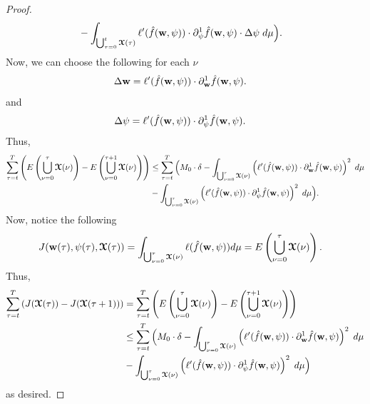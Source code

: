 \begin{proof}
\begin{align*}
        & -\displaystyle\int_{\bigcup_{\tau = 0}^{t}\boldsymbol{\mathcal{X}}(\tau)} \ell'(\hat{f}(\boldsymbol{\mathrm{w}},\psi))\cdot \partial_{\psi}^1 \hat{f}(\boldsymbol{\mathrm{w}},\psi)\cdot \Delta \psi \hspace{1mm}  d\mu\Big).
    \end{align*}
    Now, we can choose the following for each $\nu$
    \begin{align*}
        \Delta \boldsymbol{\mathrm{w}} & =  \ell'(\hat{f}(\boldsymbol{\mathrm{w}},\psi))\cdot \partial_{\boldsymbol{\mathrm{w}}}^1 \hat{f}(\boldsymbol{\mathrm{w}},\psi).
    \end{align*}
    and
    \begin{align*}
        \Delta \psi & =  \ell'(\hat{f}(\boldsymbol{\mathrm{w}},\psi))\cdot \partial_{\psi}^1 \hat{f}(\boldsymbol{\mathrm{w}},\psi).
    \end{align*}
    Thus,
    \begin{align*}
         \sum_{\tau = t}^{T} \left(E\left(\bigcup_{\nu = 0}^{\tau}\boldsymbol{\mathcal{X}}(\nu)\right) - E\left(\bigcup_{\nu = 0}^{\tau+1}\boldsymbol{\mathcal{X}}(\nu)\right)\right)
        & \leq \sum_{\tau =t}^{T} \Big( M_0\cdot \delta - \displaystyle\int_{\bigcup_{\nu = 0}^\tau\boldsymbol{\mathcal{X}}(\nu)} \left(\ell'(\hat{f}(\boldsymbol{\mathrm{w}},\psi))\cdot \partial_{\boldsymbol{\mathrm{w}}}^1 \hat{f}(\boldsymbol{\mathrm{w}},\psi)\right)^2 \hspace{1mm}  d\mu\\
        & -\displaystyle\int_{\bigcup_{\nu = 0}^\tau\boldsymbol{\mathcal{X}}(\nu)} \left(\ell'(\hat{f}(\boldsymbol{\mathrm{w}},\psi))\cdot \partial_{\psi}^1 \hat{f}(\boldsymbol{\mathrm{w}},\psi)\right)^2 \hspace{1mm}  d\mu \Big).
    \end{align*}
    Now, notice the following
    \begin{align*}
        J(\boldsymbol{\mathrm{w}}(\tau),\psi(\tau),\boldsymbol{\mathcal{X}}(\tau)) & = \int_{\bigcup_{\nu = 0}^\tau \boldsymbol{\mathcal{X}}(\nu)} \ell(\hat{f}(\boldsymbol{\mathrm{w}},\psi))d\mu = E\left(\bigcup_{\nu = 0}^{\tau}\boldsymbol{\mathcal{X}}(\nu)\right).
    \end{align*}
    Thus,
    \begin{align*}
         \sum_{\tau = t}^{T} \left(J(\boldsymbol{\mathcal{X}}(\tau)) - J(\boldsymbol{\mathcal{X}}(\tau+1))\right)
         & = \sum_{\tau = t}^{T} \left(E\left(\bigcup_{\nu = 0}^{\tau}\boldsymbol{\mathcal{X}}(\nu)\right) - E\left(\bigcup_{\nu = 0}^{\tau+1}\boldsymbol{\mathcal{X}}(\nu)\right)\right)\\
        & \leq \sum_{\tau =t}^{T} \Big( M_0\cdot \delta - \displaystyle\int_{\bigcup_{\nu = 0}^\tau\boldsymbol{\mathcal{X}}(\nu)} \left(\ell'(\hat{f}(\boldsymbol{\mathrm{w}},\psi))\cdot \partial_{\boldsymbol{\mathrm{w}}}^1 \hat{f}(\boldsymbol{\mathrm{w}},\psi)\right)^2 \hspace{1mm}  d\mu\\
        & -\displaystyle\int_{\bigcup_{\nu = 0}^\tau\boldsymbol{\mathcal{X}}(\nu)} \left(\ell'(\hat{f}(\boldsymbol{\mathrm{w}},\psi))\cdot \partial_{\psi}^1 \hat{f}(\boldsymbol{\mathrm{w}},\psi)\right)^2 \hspace{1mm}  d\mu \Big)\\
    \end{align*}
    as desired.
\end{proof}


